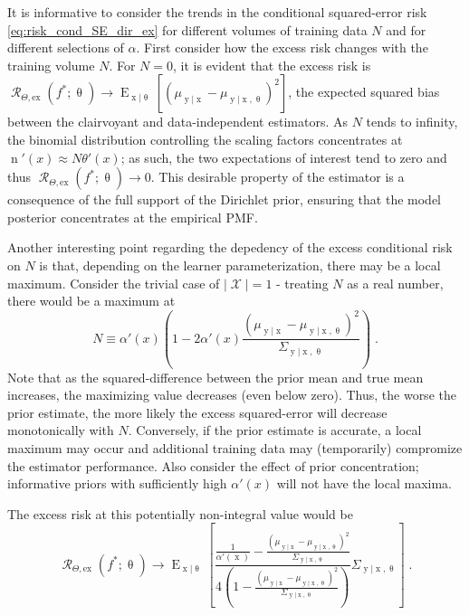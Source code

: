 \documentclass[12pt]{report}
\DeclareMathOperator{\xrm}{\mathrm{x}}
\DeclareMathOperator{\yrm}{\mathrm{y}}
\DeclareMathOperator{\nrm}{\mathrm{n}}
\DeclareMathOperator{\Erm}{\mathrm{E}}
\DeclareMathOperator{\Xcal}{\mathcal{X}}
\DeclareMathOperator{\Rcal}{\mathcal{R}}
\begin{document}
It is informative to consider the trends in the conditional squared-error risk \eqref{eq:risk_cond_SE_dir_ex} for different volumes of training data $N$ and for different selections of $\alpha$. First consider how the excess risk changes with the training volume $N$. For $N=0$, it is evident that the excess risk is $\Rcal_{\Theta, \mathrm{ex}}(f^* ; \uptheta) \to \Erm_{\xrm | \uptheta}\left[ \left( \mu_{\yrm | \xrm} - \mu_{\yrm | \xrm,\uptheta} \right)^2 \right]$,  the expected squared bias between the clairvoyant and data-independent estimators. As $N$ tends to infinity, the binomial distribution controlling the scaling factors  concentrates at $\nrm'(x) \approx N \theta'(x)$; as such, the two expectations of interest tend to zero and thus $\Rcal_{\Theta, \mathrm{ex}}(f^* ; \uptheta) \to 0$. This desirable property of the estimator is a consequence of the full support of the Dirichlet prior, ensuring that the model posterior concentrates at the empirical PMF.

Another interesting point regarding the depedency of the excess conditional risk on $N$ is that, depending on the learner parameterization, there may be a local maximum. Consider the trivial case of $|\Xcal| = 1$ - treating $N$ as a real number, there would be a maximum at 
\begin{equation}
N \equiv \alpha'(x) \left( 1 - 2 \alpha'(x) \frac{\left( \mu_{\yrm | \xrm} - \mu_{\yrm | \xrm,\uptheta} \right)^2}{\Sigma_{\yrm | \xrm,\uptheta}} \right) \;.
\end{equation}
Note that as the squared-difference between the prior mean and true mean increases, the maximizing value decreases (even below zero). Thus, the worse the prior estimate, the more likely the excess squared-error will decrease monotonically with $N$. Conversely, if the prior estimate is accurate, a local maximum may occur and additional training data may (temporarily) compromize the estimator performance. Also consider the effect of prior concentration; informative priors with sufficiently high $\alpha'(x)$ will not have the local maxima.

The excess risk at this potentially non-integral value would be 
\begin{equation}
\Rcal_{\Theta, \mathrm{ex}}(f^* ; \uptheta) \to \Erm_{\xrm | \uptheta}\left[ \frac{\frac{1}{\alpha'(\xrm)} - \frac{\left( \mu_{\yrm | \xrm} - \mu_{\yrm | \xrm,\uptheta} \right)^2}{\Sigma_{\yrm | \xrm,\uptheta}}}{4\left( 1 - \frac{\left( \mu_{\yrm | \xrm} - \mu_{\yrm | \xrm,\uptheta} \right)^2}{\Sigma_{\yrm | \xrm,\uptheta}} \right)} \Sigma_{\yrm | \xrm,\uptheta} \right] \;.
\end{equation}
\end{document}

